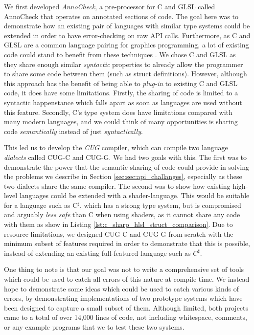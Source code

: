 \documentclass[a4paper,12pt,twoside,openright]{report}
\begin{document}
We first developed \textit{AnnoCheck}, a pre-processor for C and GLSL called
AnnoCheck that operates on annotated sections of code. The goal here was to
demonstrate how an existing pair of languages with similar type systems could
be extended in order to have error-checking on raw API calls. Furthermore, as C
and GLSL are a common language pairing for graphics programming, a lot of
existing code could stand to benefit from these techniques \cite{TODO}. We
chose C and GLSL as they share enough similar \textit{syntactic} properties to
already allow the programmer to share some code between them (such as struct
definitions). However, although this approach has the benefit of being able to
\textit{plug-in} to existing C and GLSL code, it does have some limitations.
Firstly, the sharing of code is limited to a syntactic happenstance which falls
apart as soon as languages are used without this feature. Secondly, C's type
system does have limitations compared with many modern languages, and we could
think of many opportunities is sharing code \textit{semantically} instead of
just \textit{syntactically}.


This led us to develop the \textit{CUG} compiler, which can compile two
language \textit{dialects} called CUG-C and CUG-G. We had two goals with this.
The first was to demonstrate the power that the semantic sharing of code could
provide in solving the problems we describe in Section
\ref{sec:sec:api_challanges}, especially as these two dialects share the same
compiler. The second was to show how existing high-level languages could be
extended with a shader-language. This would be suitable for a language such as
C$^\sharp$, which has a strong type system, but is compromised and arguably
\textit{less safe} than C when using shaders, as it cannot share any code with
them as show in Listing \ref{lst:c_sharp_hlsl_struct_comparison}. Due to
resource limitations, we designed CUG-C and CUG-G from scratch with the minimum
subset of features required in order to demonstrate that this is possible,
instead of extending an existing full-featured language such as $C^\sharp$.

One thing to note is that our goal was not to write a comprehensive set of
tools which could be used to catch all errors of this nature at compile-time.
We instead hope to demonstrate some ideas which could be used to catch various
kinds of errors, by demonstrating implementations of two prototype systems
which have been designed to capture a small subset of them. Although limited,
both projects came to a total of over 14,000 lines of code, not including
whitespace, comments, or any example programs that we to test these two
systems.
\end{document}
